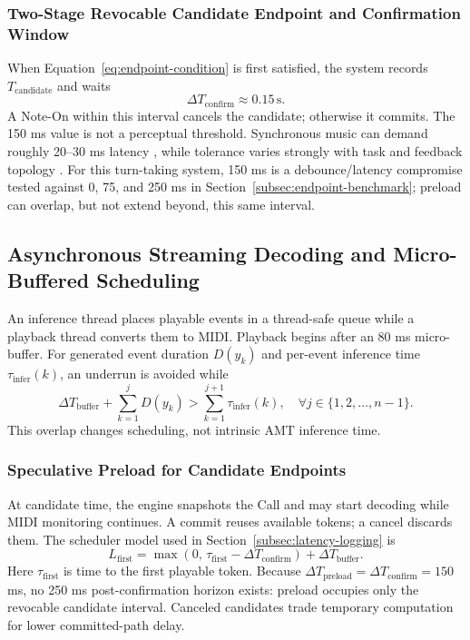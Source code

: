 \documentclass[11pt,a4paper]{article}
\begin{document}
\subsubsection{Two-Stage Revocable Candidate Endpoint and Confirmation Window}
\label{sec:revocable-endpoint}

When Equation~\eqref{eq:endpoint-condition} is first satisfied, the system records $T_{\mathrm{candidate}}$ and waits
\begin{equation}
\Delta T_{\mathrm{confirm}} \approx 0.15\,\mathrm{s}.
\label{eq:confirm-window}
\end{equation}
A Note-On within this interval cancels the candidate; otherwise it commits. The 150 ms value is not a perceptual threshold. Synchronous music can demand roughly 20--30 ms latency \citep{lago2004quest}, while tolerance varies strongly with task and feedback topology \citep{rottondi2016overview}. For this turn-taking system, 150 ms is a debounce/latency compromise tested against 0, 75, and 250 ms in Section~\ref{subsec:endpoint-benchmark}; preload can overlap, but not extend beyond, this same interval.
\subsection{Asynchronous Streaming Decoding and Micro-Buffered Scheduling}
\label{sec:streaming-decoding}

An inference thread places playable events in a thread-safe queue while a playback thread converts them to MIDI. Playback begins after an 80 ms micro-buffer. For generated event duration $D(y_k)$ and per-event inference time $\tau_{\mathrm{infer}}(k)$, an underrun is avoided while
\begin{equation}
\Delta T_{\mathrm{buffer}}
+
\sum_{k=1}^{j} D(y_k)
>
\sum_{k=1}^{j+1} \tau_{\mathrm{infer}}(k),
\quad
\forall j \in \{1,2,\ldots,n-1\}.
\label{eq:streaming-buffer-condition}
\end{equation}
This overlap changes scheduling, not intrinsic AMT inference time.

\subsubsection{Speculative Preload for Candidate Endpoints}
\label{sec:speculative-preload}

At candidate time, the engine snapshots the Call and may start decoding while MIDI monitoring continues. A commit reuses available tokens; a cancel discards them. The scheduler model used in Section~\ref{subsec:latency-logging} is
\begin{equation}
L_{\mathrm{first}}
=
\max\left(
0,\,
\tau_{\mathrm{first}}-\Delta T_{\mathrm{confirm}}
\right)
+\Delta T_{\mathrm{buffer}}.
\label{eq:perceived-latency-preload}
\end{equation}
Here $\tau_{\mathrm{first}}$ is time to the first playable token. Because $\Delta T_{\mathrm{preload}}=\Delta T_{\mathrm{confirm}}=150$ ms, no 250 ms post-confirmation horizon exists: preload occupies only the revocable candidate interval. Canceled candidates trade temporary computation for lower committed-path delay.
\end{document}
